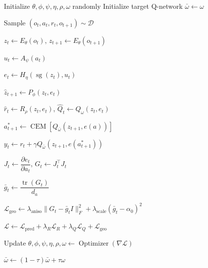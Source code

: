 ﻿\documentclass{article}
\begin{document}
\begin{algorithm}[t]
\caption{Training of the Value-Shaped Geometric Action-Effect Model}
\label{alg:training}
\begin{algorithmic}[1]

\State Initialize $\theta,\phi,\psi,\eta,\rho,\omega$ randomly
\State Initialize target Q-network $\bar{\omega} \leftarrow \omega$


    \State Sample
    $(o_t,a_t,r_t,o_{t+1}) \sim \mathcal{D}$

    \State $z_t \leftarrow E_\theta(o_t)$,
    \quad
    $z_{t+1} \leftarrow E_\theta(o_{t+1})$

    \State $u_t \leftarrow A_\psi(a_t)$

    \State $e_t \leftarrow
    H_\eta(\operatorname{sg}(z_t),u_t)$

    \State $\hat{z}_{t+1} \leftarrow P_\phi(z_t,e_t)$

    \State $\hat{r}_t \leftarrow R_\rho(z_t,e_t)$,
    \quad
    $\hat{Q}_t \leftarrow Q_\omega(z_t,e_t)$

    \State $a_{t+1}^{*}
    \leftarrow
    \operatorname{CEM}
    \left[
    Q_{\bar{\omega}}(z_{t+1},e(a))
    \right]$

    \State $y_t \leftarrow
    r_t +
    \gamma
    Q_{\bar{\omega}}
    (z_{t+1},e(a_{t+1}^{*}))$

    \State $J_t \leftarrow
    \dfrac{\partial e_t}{\partial a_t}$,
    \quad
    $G_t \leftarrow J_t^\top J_t$

    \State $\bar{g}_t \leftarrow
    \dfrac{\operatorname{tr}(G_t)}{d_a}$

    \State $\mathcal{L}_{\mathrm{geo}}
    \leftarrow
    \lambda_{\mathrm{aniso}}
    \|G_t-\bar{g}_t I\|_F^2
    +
    \lambda_{\mathrm{scale}}
    (\bar{g}_t-\alpha_0)^2$

    \State $\mathcal{L}
    \leftarrow
    \mathcal{L}_{\mathrm{pred}}
    +
    \lambda_R \mathcal{L}_R
    +
    \lambda_Q \mathcal{L}_Q
    +
    \mathcal{L}_{\mathrm{geo}}$

    \State Update
    $\theta,\phi,\psi,\eta,\rho,\omega
    \leftarrow
    \operatorname{Optimizer}(\nabla \mathcal{L})$

    \State $\bar{\omega}
    \leftarrow
    (1-\tau)\bar{\omega}
    +
    \tau\omega$

\EndFor

\end{algorithmic}
\end{algorithm}
\end{document}
